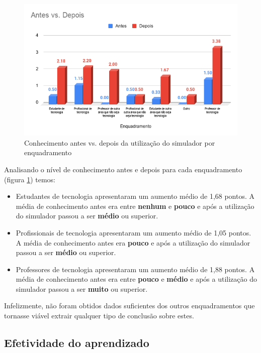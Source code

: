 \begin{figure}[H]
    \centering
    \caption{Conhecimento antes vs. depois da utilização do simulador por enquadramento}
    \label{fig:conhecimentoantesdepoisresp}
    \includegraphics[width=.9\linewidth]{Questionario/CQ2Q3.png}
\end{figure}

Analisando o nível de conhecimento antes e depois para cada enquadramento (figura \ref{fig:conhecimentoantesdepoisresp}) temos:

\begin{itemize}
    \item Estudantes de tecnologia apresentaram um aumento médio de 1,68 pontos. A média de conhecimento antes era entre \textbf{nenhum} e \textbf{pouco} e após a utilização do simulador passou a ser \textbf{médio} ou superior.
    \item Profissionais de tecnologia apresentaram um aumento médio de 1,05 pontos. A média de conhecimento antes era \textbf{pouco} e após a utilização do simulador passou a ser \textbf{médio} ou superior.
    \item Professores de tecnologia apresentaram um aumento médio de 1,88 pontos. A média de conhecimento antes era entre \textbf{pouco} e \textbf{médio} e após a utilização do simulador passou a ser \textbf{muito} ou superior.
\end{itemize}

Infelizmente, não foram obtidos dados suficientes dos outros enquadramentos que tornasse viável extrair qualquer tipo de conclusão sobre estes.

\subsection{Efetividade do aprendizado}

